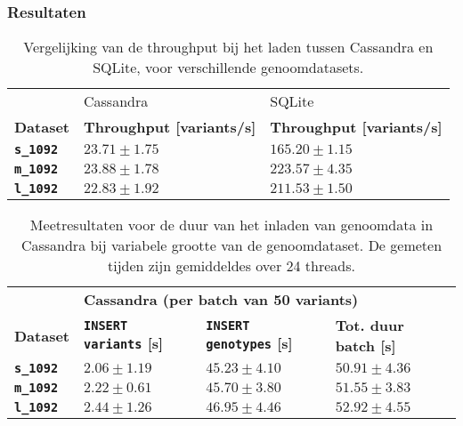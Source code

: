 \subsubsection{Resultaten}


\begin{table}[h]
\centering
\begin{tabular}{@{}lll@{}}
\cmidrule(l){2-3} & \multicolumn{1}{|l|}{Cassandra} & \multicolumn{1}{l|}{SQLite} \\
\cmidrule(l){1-3}
\multicolumn{1}{|l|}{\textbf{Dataset}}  & \multicolumn{1}{l|}{\textbf{Throughput [variants/s]}} & \multicolumn{1}{l|}{\textbf{Throughput [variants/s]}} \\ \midrule
\multicolumn{1}{|l|}{\textbf{\texttt{s\_1092}}} & \multicolumn{1}{l|}{$23.71 \pm 1.75$} & \multicolumn{1}{l|}{$165.20 \pm 1.15$}\\
\multicolumn{1}{|l|}{\textbf{\texttt{m\_1092}}} & \multicolumn{1}{l|}{$23.88 \pm 1.78$} & \multicolumn{1}{l|}{$223.57 \pm 4.35$}\\
\multicolumn{1}{|l|}{\textbf{\texttt{l\_1092}}} & \multicolumn{1}{l|}{$22.83 \pm 1.92$} & \multicolumn{1}{l|}{$211.53 \pm 1.50$}\\
\bottomrule
\end{tabular}
\caption{Vergelijking van de throughput bij het laden tussen Cassandra en SQLite, voor verschillende genoomdatasets.}
\end{table}

\begin{table}[h]
\centering
\begin{tabular}{@{}llll@{}}
\cmidrule(l){2-4}
                  & \multicolumn{3}{|l|}{\textbf{Cassandra (per batch van 50 variants)}}                                    \\ 
\cmidrule(l){1-4}
\multicolumn{1}{|l|}{\textbf{Dataset}}  & \multicolumn{1}{l|}{\textbf{\texttt{INSERT variants} [s]}} & \multicolumn{1}{l|}{\textbf{\texttt{INSERT genotypes} [s]}} & \multicolumn{1}{l|}{\textbf{Tot. duur batch [s]}}             \\ \midrule
\multicolumn{1}{|l|}{\textbf{\texttt{s\_1092}}} & \multicolumn{1}{l|}{$2.06 \pm 1.19$} & \multicolumn{1}{l|}{$45.23 \pm 4.10$}   & \multicolumn{1}{l|}{$50.91 \pm 4.36$}\\
\multicolumn{1}{|l|}{\textbf{\texttt{m\_1092}}} & \multicolumn{1}{l|}{$2.22 \pm 0.61$} & \multicolumn{1}{l|}{$45.70 \pm 3.80$}     &  \multicolumn{1}{l|}{$51.55 \pm 3.83$}  \\
\multicolumn{1}{|l|}{\textbf{\texttt{l\_1092}}} & \multicolumn{1}{l|}{$2.44 \pm 1.26$} & \multicolumn{1}{l|}{$46.95 \pm 4.46$}     &  \multicolumn{1}{l|}{$52.92 \pm 4.55$}  \\
\bottomrule
\end{tabular}
\caption{Meetresultaten voor de duur van het inladen van genoomdata in Cassandra bij variabele grootte van de genoomdataset. De gemeten tijden zijn gemiddeldes over 24 threads.}
\end{table}

